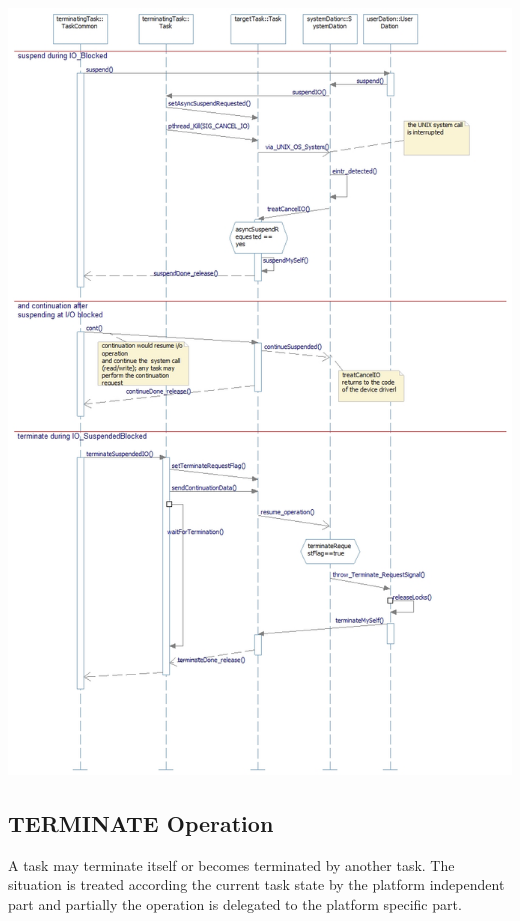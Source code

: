 \includegraphics[width=15cm]{Linux_SuspendIO.jpg}


\subsection{TERMINATE Operation}
\label{linux_terminate}
A task may terminate itself or becomes terminated by another task.
The situation is treated according the current task state by the
platform independent part and partially the operation is delegated 
to the platform specific part.


